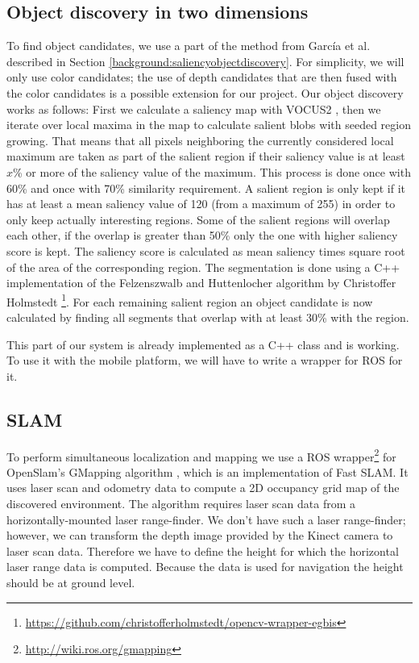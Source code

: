 \documentclass[a4paper,11pt,english]{article}
\begin{document}
\subsection{Object discovery in two dimensions}
\label{system:obj_discovery}
To find object candidates, we use a part of the method from García et al. described in Section \ref{background:saliencyobjectdiscovery}.
For simplicity, we will only use color candidates; the use of depth candidates that are then fused with the color candidates is a possible extension for our project.
Our object discovery works as follows: First we calculate a saliency map with VOCUS2 \cite{frintrop2015traditional}, then we iterate over local maxima in the map to calculate salient blobs with seeded region growing.
That means that all pixels neighboring the currently considered local maximum are taken as part of the salient region if their saliency value is at least \(x\)\% or more of the saliency value of the maximum.
This process is done once with 60\% and once with 70\% similarity requirement.
A salient region is only kept if it has at least a mean saliency value of 120 (from a maximum of 255) in order to only keep actually interesting regions.
Some of the salient regions will overlap each other, if the overlap is greater than 50\% only the one with higher saliency score is kept.
The saliency score is calculated as mean saliency times square root of the area of the corresponding region.
The segmentation is done using a C++ implementation of the Felzenszwalb and Huttenlocher algorithm \cite{felzenszwalb2004efficient} by Christoffer Holmstedt \footnote{\url{https://github.com/christofferholmstedt/opencv-wrapper-egbis}}.
For each remaining salient region an object candidate is now calculated by finding all segments that overlap with at least 30\% with the region.

This part of our system is already implemented as a C++ class and is working.
To use it with the mobile platform, we will have to write a wrapper for ROS for it.

\subsection{SLAM}
\label{system:slam}
To perform simultaneous localization and mapping we use a ROS wrapper\footnote{\url{http://wiki.ros.org/gmapping}} for OpenSlam's GMapping algorithm \cite{grisetti2007}, which is an implementation of Fast SLAM.
It uses laser scan and odometry data to compute a 2D occupancy grid map of the discovered environment.
The algorithm requires laser scan data from a horizontally-mounted laser range-finder.
We don't have such a laser range-finder; however, we can transform the depth image provided by the Kinect camera to laser scan data.
Therefore we have to define the height for which the horizontal laser range data is computed.
Because the data is used for navigation the height should be at ground level.
\end{document}

